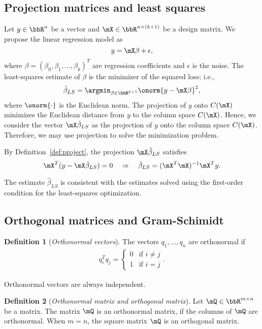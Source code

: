 \documentclass[11pt]{article}
\theoremstyle{plain}
\theoremstyle{definition}
\newtheorem{defn}{Definition}
\begin{document}
\subsection{Projection matrices and least squares}
Let $y \in \bbR^n$ be a vector and $\mX \in \bbR^{n \times (k+1)}$ be a design matrix. We propose the linear regression model as
\[ y = \mX \beta +\epsilon,\]
where $\beta = (\beta_0,\beta_1,...,\beta_k)^T$ are regression coefficients and $\epsilon$ is the noise. The least-squares estimate of $\beta$ is the minimizer of the squared loss; i.e.,
\[  \hat \beta_{LS} = \argmin_{\beta \in \bbR^{k+1}} \onorm{y - \mX \beta}^2, \]
where $\onorm{\cdot}$ is the Euclidean norm.  The projection of $y$ onto $C(\mX)$ minimizes the Euclidean distance from $y$ to the column space $C(\mX)$. Hence,   we consider the vector $\mX 
\hat \beta_{LS}$ as the projection of $y$ onto the column space $C(\mX)$. Therefore, we may use projection to solve the minimization problem. 

By Definition~\ref{def:project}, the projection $\mX \hat \beta_{LS}$ satisfies
\[ \mX^T( y - \mX \hat \beta_{LS} ) = 0 \quad \Rightarrow \quad \hat \beta_{LS} = (\mX^T \mX)^{-1} \mX^T y. \]

The estimate $\hat \beta_{LS}$ is consistent with the estimates solved using the first-order condition for the least-squares optimization. 

\subsection{Orthogonal matrices and Gram-Schimidt}
\begin{defn}[\textit{Orthonormal vectors}]\label{def:othronov}
	The vectors $q_1,...,q_n$ are orthonormal if
	\begin{align}
		q_i^T q_j = \begin{cases}
			0& \text{if } i\neq j\\
			1 & \text{if } i =  j
		\end{cases}.
	\end{align}
\end{defn}

Orthonormal vectors are always independent.

\begin{defn}[\textit{Orthonormal matrix and orthogonal matrix}]\label{def:orthonom}
	Let  $\mQ \in \bbR^{m \times n}$ be a matrix. The matrix $\mQ$ is an orthonormal matrix, if the columns of $\mQ$ are orthonormal. When $ m= n$, the square matrix $\mQ$ is an orthogonal matrix.
\end{defn}
\end{document}
